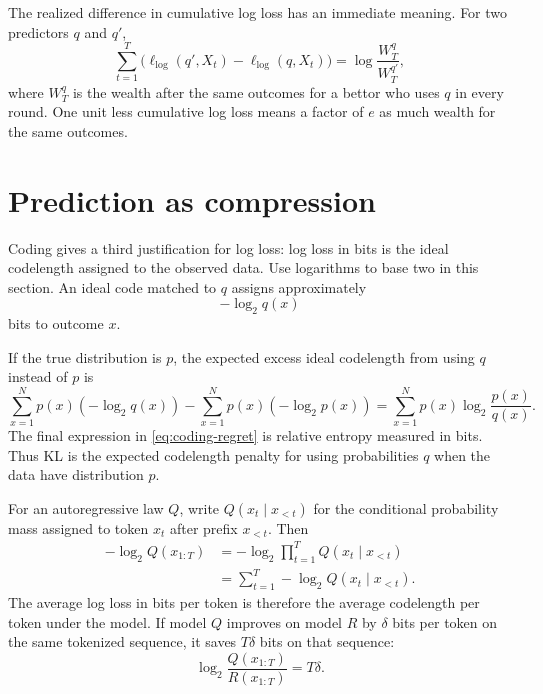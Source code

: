 \documentclass[11pt,twoside]{article}
\theoremstyle{definition}
\theoremstyle{remark}
\begin{document}
The realized difference in cumulative log loss has an immediate meaning.
For two predictors $q$ and $q'$,
\begin{equation}
\sum_{t=1}^T\bigl(\ell_{\log}(q',X_t)-
\ell_{\log}(q,X_t)\bigr)
=\log\frac{W_T^q}{W_T^{q'}},
\label{eq:loss-wealth-ratio}
\end{equation}
where $W_T^q$ is the wealth after the same outcomes for a bettor who uses $q$
in every round. One unit less cumulative log loss means a factor of $e$ as much
wealth for the same outcomes.

\section{Prediction as compression}
\label{sec:compression}

Coding gives a third justification for log loss: log loss in bits is the ideal
codelength assigned to the observed data. Use logarithms to base two in this
section. An ideal code matched to $q$ assigns
approximately
\begin{equation}
-\log_2 q(x)
\label{eq:single-code-length}
\end{equation}
bits to outcome $x$.

If the true distribution is $p$, the expected excess ideal codelength from
using $q$ instead of $p$ is
\begin{equation}
\sum_{x=1}^N p(x)(-\log_2 q(x))
-\sum_{x=1}^N p(x)(-\log_2 p(x))
=\sum_{x=1}^N p(x)\log_2\frac{p(x)}{q(x)}.
\label{eq:coding-regret}
\end{equation}
The final expression in \cref{eq:coding-regret} is relative entropy measured
in bits. Thus KL is the expected codelength
penalty for using probabilities $q$ when the data have distribution $p$.

For an autoregressive law \(Q\), write
\(Q(x_t\mid x_{<t})\) for the conditional probability mass assigned to token
\(x_t\) after prefix \(x_{<t}\). Then
\begin{align}
-\log_2 Q(x_{1:T})
&=-\log_2\prod_{t=1}^TQ(x_t\mid x_{<t})
\nonumber\\
&=\sum_{t=1}^T-\log_2Q(x_t\mid x_{<t}).
\label{eq:sequence-code-length}
\end{align}
The average log loss in bits per token is therefore the average codelength per
token under the model. If model $Q$ improves on model $R$ by $\delta$ bits per
token on the same tokenized sequence, it saves $T\delta$ bits on that sequence:
\begin{equation}
\log_2\frac{Q(x_{1:T})}{R(x_{1:T})}
=T\delta.
\label{eq:compression-likelihood-ratio}
\end{equation}
\end{document}

